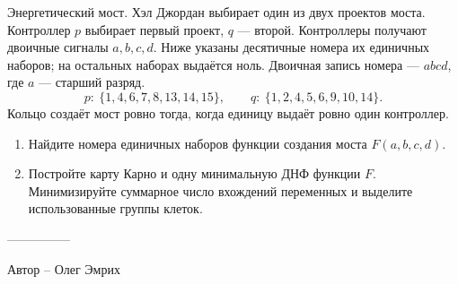 \question
Энергетический мост. Хэл Джордан выбирает один из двух проектов моста. Контроллер $p$ выбирает первый проект, $q$ --- второй. Контроллеры получают двоичные сигналы $a,b,c,d$. Ниже указаны десятичные номера их единичных наборов; на остальных наборах выдаётся ноль. Двоичная запись номера --- $abcd$, где $a$ --- старший разряд.
\[
p:\ \{1, 4, 6, 7, 8, 13, 14, 15\},\qquad q:\ \{1, 2, 4, 5, 6, 9, 10, 14\}.
\]
Кольцо создаёт мост ровно тогда, когда единицу выдаёт ровно один контроллер.
\begin{enumerate}
\item Найдите номера единичных наборов функции создания моста $F(a,b,c,d)$.
\item Постройте карту Карно и одну минимальную ДНФ функции $F$. Минимизируйте суммарное число вхождений переменных и выделите использованные группы клеток.
\end{enumerate}

---------------

Автор -- Олег Эмрих
